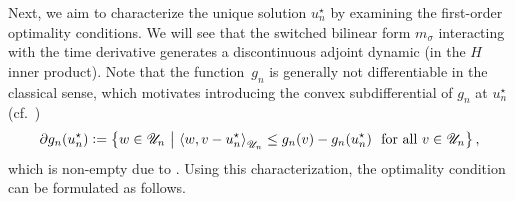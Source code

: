 \documentclass[reqno]{amsart}
\newcommand{\U}{{\mathscr U}}
\newcommand{\inpVar}{u}
\newcommand{\optInpVar}[1]{\inpVar_{#1}^\star}
\newcommand{\optInpVarN}{\optInpVar{n}}
\newcommand{\switch}{\sigma}
\begin{document}
%
Next, we aim to characterize the unique solution $\optInpVarN$ by examining the first-order optimality conditions. We will see that the switched bilinear form $m_{\switch}$ interacting with the time derivative generates a discontinuous adjoint dynamic (in the $H$ inner product).
Note that the function~$g_n$ is generally not differentiable in the classical sense, which motivates introducing the convex subdifferential of $g_n$ at $\optInpVarN$ (cf.~\cite[Def.~16.1]{bauschke2011convex})
\begin{align}\label{eqn: convex subdifferential}
		\partial g_n(\optInpVarN)\vcentcolon=\left\{w\in \U_n \ \big| \ {\langle w, v-\optInpVarN \rangle}_{\U_n} \leq g_n(v) -g_n(\optInpVarN)\ \text{ for all }v \in \U_n \right\},
\end{align}
which is non-empty due to . Using this characterization, the optimality condition can be formulated as follows.
\end{document}
